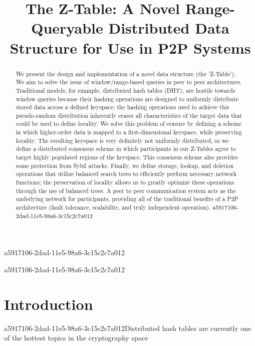 \documentclass[12pt]{article}
\title{The Z-Table: A Novel Range-Queryable Distributed Data Structure for Use in P2P Systems}
\begin{document}
\maketitle

a5917106-2dad-11e5-98a6-3c15c2c7a012\begin{abstract}
We present the design and implementation of a novel data structure (the 'Z-Table'). We aim to solve the issue of window/range-based queries in peer to peer architectures. Traditional models, for example,  distributed hash tables (DHT), are hostile towards window queries because their hashing operations are designed to uniformly distribute stored data across a defined keyspace; the hashing operations used to achieve this pseudo-random distribution inherently erases all characteristics of the target data that could be used to define locality. We solve this problem of erasure by defining a scheme in which higher-order data is mapped to a first-dimensional keyspace, while preserving locality. The resulting keyspace is very definitely not uniformly distributed, so we define a distributed consensus scheme in which participants in our Z-Tables agree to target highly populated regions of the keyspace. This consensus scheme also provides some protection from Sybil attacks. Finally, we define storage, lookup, and deletion operations that utilize balanced search trees to efficiently perform necessary network functions; the preservation of locality allows us to greatly optimize these operations through the use of balanced trees. A peer to peer communication system acts as the underlying network for participants, providing all of the traditional benefits of a P2P architecture (fault tolerance, scalability, and truly independent operation).
a5917106-2dad-11e5-98a6-3c15c2c7a012\end{abstract}
a5917106-2dad-11e5-98a6-3c15c2c7a012

\newpage
\section{Introduction}
a5917106-2dad-11e5-98a6-3c15c2c7a012Distributed hash tables are currently one of the hottest topics in the cryptography space~\cite{Stoica:2001dj,Rowstron:2001ea,Ratnasamy:2001wn}

\printbibliography
\end{document}
